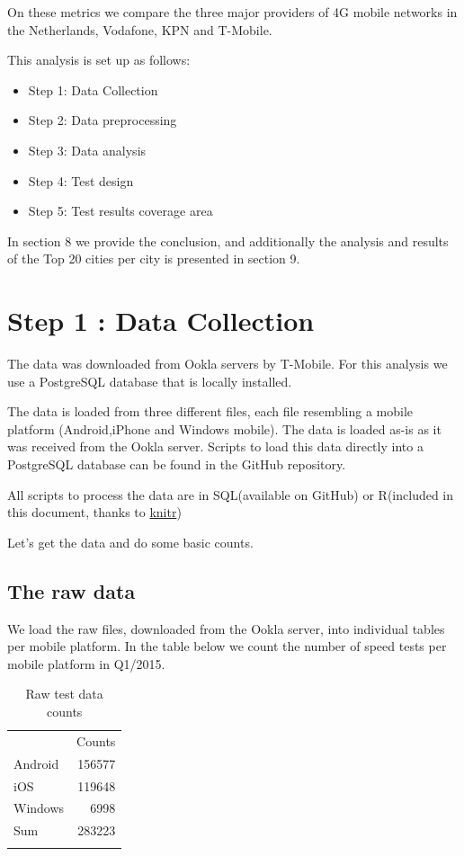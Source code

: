 \documentclass[]{article}
\begin{document}
On these metrics we compare the three major providers of 4G mobile
networks in the Netherlands, Vodafone, KPN and T-Mobile.

This analysis is set up as follows:

\begin{itemize}
\itemsep1pt\parskip0pt
\item
  Step 1: Data Collection
\item
  Step 2: Data preprocessing
\item
  Step 3: Data analysis
\item
  Step 4: Test design
\item
  Step 5: Test results coverage area
\end{itemize}

In section 8 we provide the conclusion, and additionally the analysis
and results of the Top 20 cities per city is presented in section 9.

\section{Step 1 : Data Collection}\label{step-1-data-collection}

The data was downloaded from Ookla servers by T-Mobile. For this
analysis we use a PostgreSQL database that is locally installed.

The data is loaded from three different files, each file resembling a
mobile platform (Android,iPhone and Windows mobile). The data is loaded
as-is as it was received from the Ookla server. Scripts to load this
data directly into a PostgreSQL database can be found in the GitHub
repository.

All scripts to process the data are in SQL(available on GitHub) or
R(included in this document, thanks to
\href{http://yihui.name/knitr/}{knitr})

Let's get the data and do some basic counts.

\subsection{The raw data}\label{the-raw-data}

We load the raw files, downloaded from the Ookla server, into individual
tables per mobile platform. In the table below we count the number of
speed tests per mobile platform in Q1/2015.

\begin{longtable}[c]{@{}lr@{}}
\toprule\addlinespace
& Counts
\\\addlinespace
\midrule\endhead
Android & 156577
\\\addlinespace
iOS & 119648
\\\addlinespace
Windows & 6998
\\\addlinespace
Sum & 283223
\\\addlinespace
\bottomrule
\addlinespace
\caption{Raw test data counts}
\end{longtable}
\end{document}
